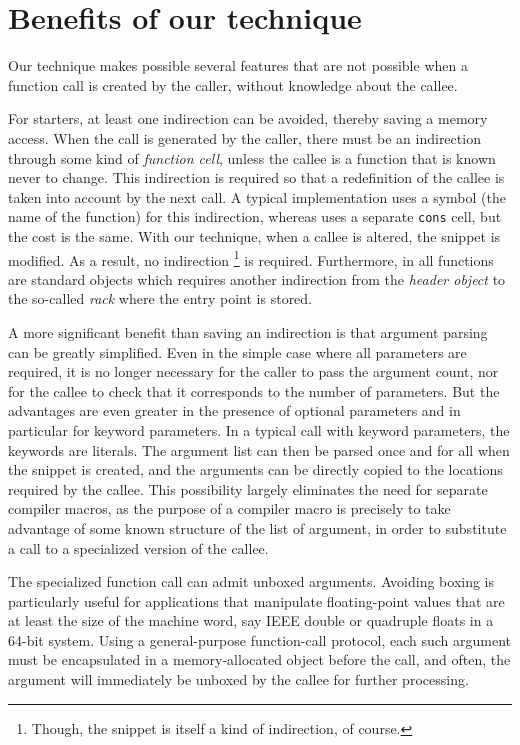 \section{Benefits of our technique}
\label{sec-benefits}

Our technique makes possible several features that are not possible
when a function call is created by the caller, without knowledge
about the callee.

For starters, at least one indirection can be avoided, thereby saving
a memory access.  When the call is generated by the caller, there must
be an indirection through some kind of \emph{function cell}, unless the
callee is a function that is known never to change.  This indirection
is required so that a redefinition of the callee is taken into account
by the next call.  A typical \commonlisp{} implementation uses a
symbol (the name of the function) for this indirection, whereas
\sicl{} uses a separate \texttt{cons} cell, but the cost is the same.
With our technique, when a callee is altered, the snippet is
modified.  As a result, no indirection%
\footnote{Though, the snippet is itself a kind of indirection, of course.}
is required.  Furthermore, in
\sicl{} all functions are standard objects which requires another
indirection from the \emph{header object} to the so-called \emph{rack}
where the entry point is stored.

A more significant benefit than saving an indirection is that argument
parsing can be greatly simplified.  Even in the simple case where all
parameters are required, it is no longer necessary for the caller to
pass the argument count, nor for the callee to check that it
corresponds to the number of parameters.  But the advantages are even
greater in the presence of optional parameters and in particular for
keyword parameters.  In a typical call with keyword parameters, the
keywords are literals.  The argument list can then be parsed once and
for all when the snippet is created, and the arguments can be directly
copied to the locations required by the callee.  This possibility
largely eliminates the need for separate compiler macros, as the
purpose of a compiler macro is precisely to take advantage of some
known structure of the list of argument, in order to substitute a call
to a specialized version of the callee.

The specialized function call can admit unboxed arguments.  Avoiding
boxing is particularly useful for applications that manipulate
floating-point values that are at least the size of the machine word,
say IEEE double or quadruple floats in a 64-bit system.  Using a
general-purpose function-call protocol, each such argument must be
encapsulated in a memory-allocated object before the call, and often,
the argument will immediately be unboxed by the callee for further
processing.

